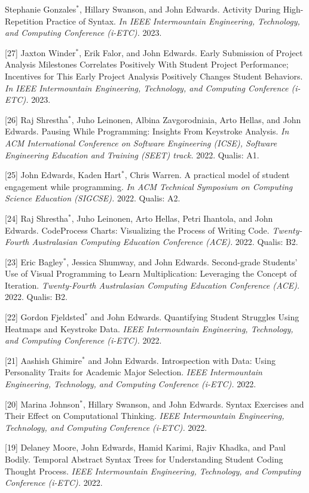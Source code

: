 \documentclass[margin,line]{res}
\newcommand{\cnum}[1]{[#1]}
\begin{document}
\begin{resume}
\cnum{28} Stephanie Gonzales$^*$, Hillary Swanson, and John Edwards. Activity During High-Repetition Practice of Syntax. \textit{In IEEE Intermountain Engineering, Technology, and Computing Conference (i-ETC).} 2023.

\cnum{27} Jaxton Winder$^*$, Erik Falor, and John Edwards. Early Submission of Project Analysis Milestones Correlates Positively With Student Project Performance; Incentives for This Early Project Analysis Positively Changes Student Behaviors. \textit{In IEEE Intermountain Engineering, Technology, and Computing Conference (i-ETC).} 2023.

\cnum{26} Raj Shrestha$^*$, Juho Leinonen, Albina Zavgorodniaia, Arto Hellas, and John Edwards. Pausing While Programming: Insights From Keystroke Analysis. \textit{In ACM International Conference on Software Engineering (ICSE), Software Engineering Education and Training (SEET) track.} 2022. Qualis: A1.

\cnum{25} John Edwards, Kaden Hart$^*$, Chris Warren. A practical model of student engagement while programming. \textit{In ACM Technical Symposium on Computing Science Education (SIGCSE).} 2022. Qualis: A2.

\cnum{24} Raj Shrestha$^*$, Juho Leinonen, Arto Hellas, Petri Ihantola, and John Edwards. CodeProcess Charts: Visualizing the Process of Writing Code. \textit{Twenty-Fourth Australasian Computing Education Conference (ACE).} 2022. Qualis: B2.

\cnum{23} Eric Bagley$^*$, Jessica Shumway, and John Edwards. Second-grade Students' Use of Visual Programming to Learn Multiplication: Leveraging the Concept of Iteration. \textit{Twenty-Fourth Australasian Computing Education Conference (ACE).} 2022. Qualis: B2.

\cnum{22} Gordon Fjeldsted$^*$ and John Edwards. Quantifying Student Struggles Using Heatmaps and Keystroke Data. \textit{IEEE Intermountain Engineering, Technology, and Computing Conference (i-ETC).} 2022.

\cnum{21} Aashish Ghimire$^*$ and John Edwards. Introspection with Data: Using Personality Traits for Academic Major Selection. \textit{IEEE Intermountain Engineering, Technology, and Computing Conference (i-ETC).} 2022.

\cnum{20} Marina Johnson$^*$, Hillary Swanson, and John Edwards. Syntax Exercises and Their Effect on Computational Thinking. \textit{IEEE Intermountain Engineering, Technology, and Computing Conference (i-ETC).} 2022.

\cnum{19} Delaney Moore, John Edwards, Hamid Karimi, Rajiv Khadka, and Paul Bodily. Temporal Abstract Syntax Trees for Understanding Student Coding Thought Process. \textit{IEEE Intermountain Engineering, Technology, and Computing Conference (i-ETC).} 2022.


\end{resume}
\end{document}
